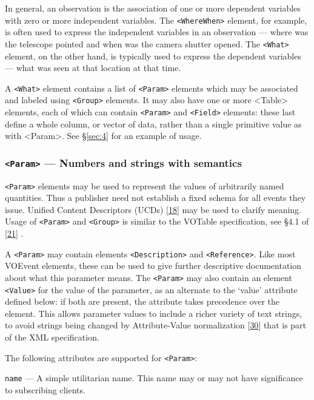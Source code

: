 \documentclass[11pt,a4paper]{ivoa}
\begin{document}
In general, an observation is the association of one or more dependent variables with zero or more independent variables. The {\tt <WhereWhen>} element, for example, is often used to express the independent variables in an observation --- where was the telescope pointed and when was the camera shutter opened. The {\tt <What>} element, on the other hand, is typically used to express the dependent variables --- what was seen at that location at that time. 

A {\tt <What>} element contains a list of {\tt <Param>} elements which may be associated and labeled using {\tt <Group>} elements. It may also have one or more <Table> elements, each of which can contain {\tt <Param>} and {\tt <Field>} elements: these last define a whole column, or vector of data, rather than a single primitive value as with <Param>. See \S\ref{sec:4} for an example of usage. 

\subsubsection{{\tt <Param>} --- Numbers and strings with semantics}
\label{sec:3.3.1}
{\tt <Param>} elements may be used to represent the values of arbitrarily named quantities. Thus a publisher need not establish a fixed schema for all events they issue. Unified Content Descriptors (UCDs) [\hyperref[bib18]{18}]
may be used to clarify meaning. Usage of {\tt <Param>} and {\tt <Group>} is similar to the VOTable specification, see \S4.1 of [\hyperref[bib21]{21}]
. 

A {\tt <Param>} may contain elements {\tt <Description>} and {\tt <Reference>}. Like most VOEvent elements, these can be used to give further descriptive documentation about what this parameter means. The {\tt <Param>} may also contain an element {\tt <Value>} for the value of the parameter, as an alternate to the `value' attribute defined below: if both are present, the attribute takes precedence over the element. This allows parameter values to include a richer variety of text strings, to avoid strings being changed by Attribute-Value normalization [\hyperref[bib30]{30}] that is part of the XML specification. 

The following attributes are supported for {\tt <Param>}: 

 {\tt name}\label{sec:3.3.1.1} --- A simple utilitarian name. This name may or may not have significance to subscribing clients. 
\end{document}

